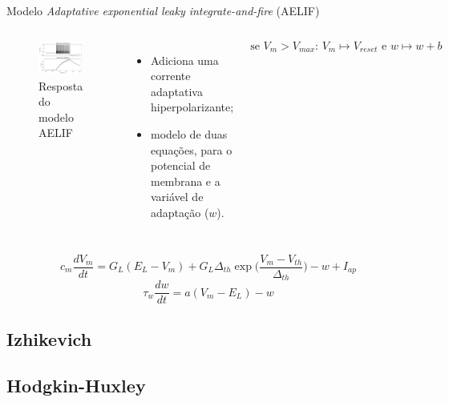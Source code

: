 \begin{frame}{Modelo \textit{Adaptative exponential leaky integrate-and-fire} (AELIF)}
	\begin{columns}[t]
		\column{5cm}
			\begin{figure}[tb]
				\centering
				\caption{Resposta do modelo AELIF}
				\label{fig:adexrs}
				\includegraphics[width=0.8\linewidth]{figs/aelif}
			\end{figure}
		\column{5cm}
		\begin{itemize}
			\item Adiciona uma corrente adaptativa hiperpolarizante;
			\item modelo de duas equações, para o potencial de membrana e a variável de adaptação ($w$).
		\end{itemize}
		\[
			\text{se } V_m > V_{max} \text{: } V_m\mapsto V_{reset} \text{ e } w\mapsto w + b
		\]
	\end{columns}
	\vfill
	\[
	c_m\frac{dV_m}{dt} = G_L(E_L-V_m) + G_L\Delta_{th}\exp\Big(\frac{V_m-V_{th}}{\Delta_{th}}\Big) - w + I_{ap}
	\]\[
	\tau_w\frac{dw}{dt}=a(V_m-E_L)-w
	\]
\end{frame}

\subsection{Izhikevich}

\subsection{Hodgkin-Huxley}
